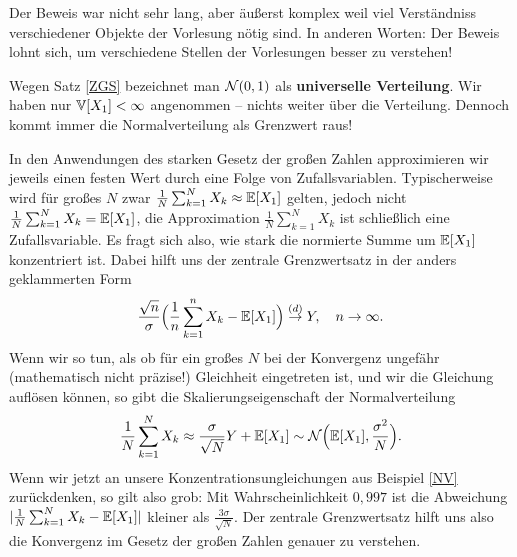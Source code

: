 Der Beweis war nicht sehr lang, aber \"au\ss erst komplex weil viel Verst\"andniss verschiedener Objekte der Vorlesung n\"otig sind. In anderen Worten: Der Beweis lohnt sich, um verschiedene Stellen der Vorlesungen besser zu verstehen!


\begin{bem}
	Wegen Satz \ref{ZGS} bezeichnet man $\mathcal{N}(0,1)$ als \textbf{universelle Verteilung}. Wir haben nur $\mathbb{V}[X_1] < \infty$ angenommen -- nichts weiter über die Verteilung. Dennoch kommt immer die Normalverteilung als Grenzwert raus!
\end{bem}
In den Anwendungen des starken Gesetz der gro\ss en Zahlen approximieren wir jeweils einen festen Wert durch eine Folge von Zufallsvariablen. Typischerweise wird f\"ur gro\ss es $N$ zwar $\frac{1}{N}\sum_{k=1}^N X_k \approx \mathbb{E}[X_1]$ gelten, jedoch nicht $\frac{1}{N}\sum_{k=1}^N X_k = \mathbb{E}[X_1]$, die Approximation $\frac{1}{N}\sum_{k=1}^N X_k$ ist schlie\ss lich eine Zufallsvariable. Es fragt sich also, wie stark die normierte Summe um $\mathbb{E}[X_1]$ konzentriert ist. Dabei hilft uns der zentrale Grenzwertsatz in der anders geklammerten Form
	\begin{align*}
		\frac{\sqrt{n}}{\sigma} \Big(\frac{1}{n} \sum_{k=1}^n X_k-\mathbb{E}[X_1]\Big) \overset{(d)}\to Y,\quad n\to\infty.
	\end{align*}
	Wenn wir so tun, als ob f\"ur ein gro\ss es $N$ bei der Konvergenz ungef\"ahr (mathematisch nicht pr\"azise!) Gleichheit eingetreten ist, und wir die Gleichung aufl\"osen k\"onnen, so gibt die Skalierungseigenschaft der Normalverteilung
\begin{align}\label{MC}
	\frac{1}{N} \sum_{k=1}^N X_k \approx \frac{\sigma}{\sqrt{N}} Y+\mathbb{E}[X_1]\sim \mathcal N\Big(\mathbb{E}[X_1], \frac{\sigma^2}{N}\Big).
\end{align}
Wenn wir jetzt an unsere Konzentrationsungleichungen aus Beispiel \ref{NV} zur\"uckdenken, so gilt also grob: Mit Wahrscheinlichkeit $0,997$ ist die Abweichung $|\frac{1}{N} \sum_{k=1}^N X_k-\mathbb{E}[X_1]|$ kleiner als  $\frac{3\sigma}{\sqrt{N}}$. Der zentrale Grenzwertsatz hilft uns also die Konvergenz im Gesetz der gro\ss en Zahlen genauer zu verstehen.

